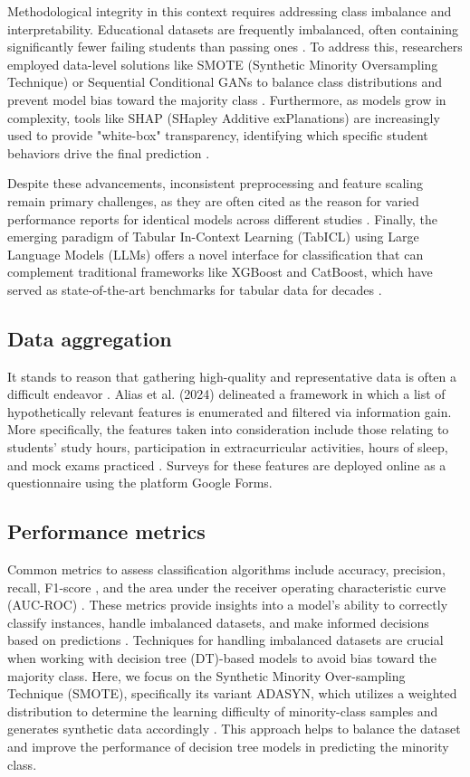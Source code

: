 Methodological integrity in this context requires addressing class imbalance and interpretability. Educational datasets are frequently imbalanced, often containing significantly fewer failing students than passing ones \cite{Bujang2021, Tong2025}. To address this, researchers employed data-level solutions like SMOTE (Synthetic Minority Oversampling Technique) or Sequential Conditional GANs to balance class distributions and prevent model bias toward the majority class \cite{Bujang2021}. Furthermore, as models grow in complexity, tools like SHAP (SHapley Additive exPlanations) are increasingly used to provide "white-box" transparency, identifying which specific student behaviors drive the final prediction \cite{Tong2025}.

Despite these advancements, inconsistent preprocessing and feature scaling remain primary challenges, as they are often cited as the reason for varied performance reports for identical models across different studies \cite{Alhakbani2022}. Finally, the emerging paradigm of Tabular In-Context Learning (TabICL) using Large Language Models (LLMs) offers a novel interface for classification that can complement traditional frameworks like XGBoost and CatBoost, which have served as state-of-the-art benchmarks for tabular data for decades \cite{Wen2025}.

\subsection{Data aggregation}
It stands to reason that gathering high-quality and representative data is often a difficult endeavor \cite{Alias2024}. Alias et al. (2024) delineated a framework in which a list of hypothetically relevant features is enumerated and filtered via information gain. More specifically, the features taken into consideration include those relating to students' study hours, participation in extracurricular activities, hours of sleep, and mock exams practiced \cite{Suleiman2024}. Surveys for these features are deployed online as a questionnaire using the platform Google Forms.


\subsection{Performance metrics}
Common metrics to assess classification algorithms include accuracy, precision, recall, F1-score \cite{Alias2024, Zaky2023}, and the area under the receiver operating characteristic curve (AUC-ROC) \cite{Brzezinski2017, Yang2017}. These metrics provide insights into a model's ability to correctly classify instances, handle imbalanced datasets, and make informed decisions based on predictions \cite{Brzezinski2017}. Techniques for handling imbalanced datasets are crucial when working with decision tree (DT)-based models to avoid bias toward the majority class. Here, we focus on the Synthetic Minority Over-sampling Technique (SMOTE), specifically its variant ADASYN, which utilizes a weighted distribution to determine the learning difficulty of minority-class samples and generates synthetic data accordingly \cite{Chawla2011, Elreedy2019}. This approach helps to balance the dataset and improve the performance of decision tree models in predicting the minority class.